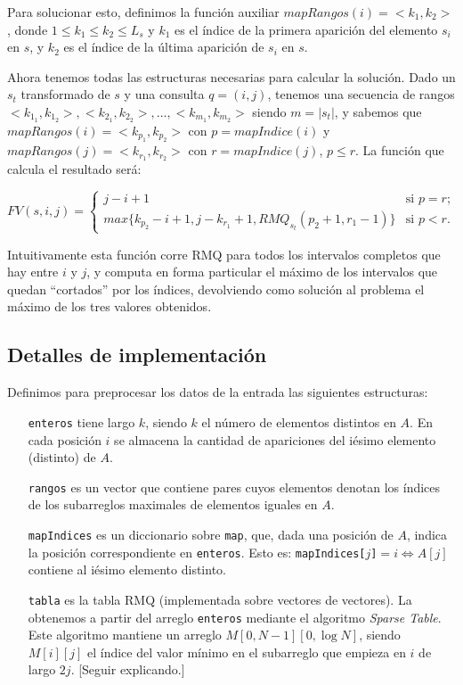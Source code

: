 Para solucionar esto, definimos la función auxiliar $mapRangos(i) = <k_1,k_2>$,
donde $1 \le k_1 \le k_2 \le L_s$ y $k_1$ es el índice de la primera aparición
del elemento $s_i$ en $s$, y $k_2$ es el índice de la última aparición de $s_i$ en $s$.

Ahora tenemos todas las estructuras necesarias para calcular la solución. Dado
un $s_t$ transformado de $s$ y una consulta $q = (i, j)$, tenemos una
secuencia de rangos $<k_{1_1}, k_{1_2}>, <k_{2_1}, k_{2_2}>, \ldots, <k_{m_1}, k_{m_2}>$
siendo $m = |s_t|$, y sabemos que $mapRangos(i) = <k_{p_1}, k_{p_2}>$ con
$p = mapIndice(i)$ y $mapRangos(j) = <k_{r_1}, k_{r_2}>$ con $r = mapIndice(j)$, $p \le r$.
La función que calcula el resultado será:

\[ FV(s, i, j) = \left\{ \begin{array}{ll}
                 j - i + 1 & \mbox{si $p = r$};\\
                 max\{ k_{p_2} - i + 1, j - k_{r_1} + 1, RMQ_{s_t}(p_2 + 1, r_1 - 1) \} & \mbox{si $p < r$}.\end{array} \right. \]
     
Intuitivamente esta función corre RMQ para todos los intervalos completos
que hay entre $i$ y $j$, y computa en forma particular el máximo de los
intervalos que quedan ``cortados'' por los índices, devolviendo como solución al
problema el máximo de los tres valores obtenidos.


\subsection*{Detalles de implementación}

Definimos para preprocesar los datos de la entrada las siguientes estructuras:

\begin{itemize}
  \item[\tt enteros] tiene largo $k$, siendo $k$ el número de elementos
  distintos en $A$. En cada posición $i$ se almacena la cantidad de apariciones
  del iésimo elemento (distinto) de $A$.

  \item[\tt rangos] es un vector que contiene pares cuyos elementos denotan
  los índices de los subarreglos maximales de elementos iguales en $A$.

  \item[\tt mapIndices] es un diccionario sobre {\tt map}, que, dada una
  posición de $A$, indica la posición correspondiente en {\tt enteros}. Esto es:
  {\tt mapIndices[$j$]}$=i \Leftrightarrow A[j]$ contiene al iésimo elemento
  distinto.

  \item[\tt tabla] es la tabla RMQ (implementada sobre vectores de vectores).
  La obtenemos a partir del arreglo {\tt enteros} mediante el algoritmo {\sl
  Sparse Table}. Este algoritmo mantiene un arreglo $M[0,N-1][0,\log N]$,
  siendo $M[i][j]$ el índice del valor mínimo en el subarreglo que empieza en
  $i$ de largo $2j$. [Seguir explicando.] \cite{topcoder}
\end{itemize}

